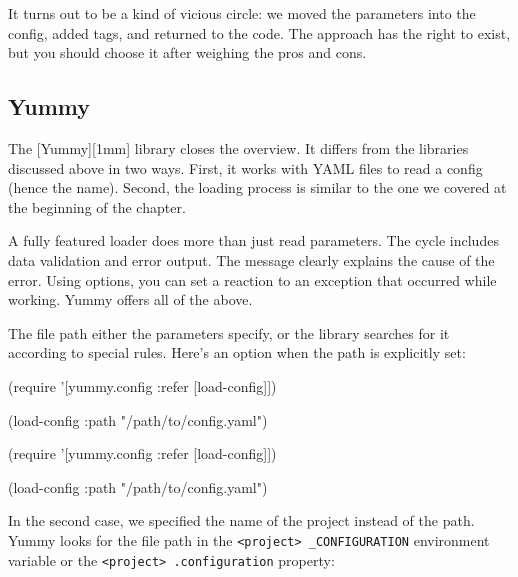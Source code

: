 It turns out to be a kind of vicious circle: we moved the parameters into the config, added tags, and returned to the code. The approach has the right to exist, but you should choose it after weighing the pros and cons.

\subsection{Yummy}


The [Yummy][1mm] library closes the overview. It differs from the libraries discussed above in two ways. First, it works with YAML files to read a config (hence the name). Second, the loading process is similar to the one we covered at the beginning of the chapter.

A fully featured loader does more than just read parameters. The cycle includes data validation and error output. The message clearly explains the cause of the error. Using options, you can set a reaction to an exception that occurred while working. Yummy offers all of the above.

The file path either the parameters specify, or the library searches for it according to special rules. Here's an option when the path is explicitly set:

\ifx\DEVICETYPE\MOBILE

\begin{english}
  \begin{clojure}
(require
  '[yummy.config :refer [load-config]])

(load-config
  {:path "/path/to/config.yaml"})
  \end{clojure}
\end{english}

\else

\begin{english}
  \begin{clojure}
(require '[yummy.config :refer [load-config]])

(load-config {:path "/path/to/config.yaml"})
  \end{clojure}
\end{english}

\fi

In the second case, we specified the name of the project instead of the path. Yummy looks for the file path in the \verb|<project> _CONFIGURATION| environment variable or the \verb|<project> .configuration| property:

